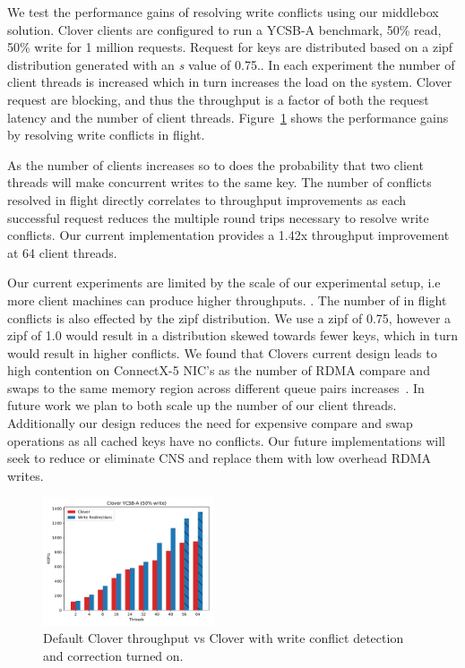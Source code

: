 We test the performance gains of resolving write conflicts using our
middlebox solution. Clover clients are configured to run a YCSB-A
benchmark, 50\% read, 50\% write for 1 million requests. Request for
keys are distributed based on a zipf distribution generated with an
\textit{s} value of 0.75.. In each
experiment the number of client threads is increased which in turn
increases the load on the system. Clover request are blocking, and
thus the throughput is a factor of both the request latency and the
number of client threads. Figure~\ref{fig:conflicts} shows the
performance gains by resolving write conflicts in flight.

As the number of clients increases so to does the probability that two
client threads will make concurrent writes to the same key. The number
of conflicts resolved in flight directly correlates to throughput
improvements as each successful request reduces the multiple round
trips necessary to resolve write conflicts. Our current implementation
provides a 1.42x throughput improvement at 64 client threads.

Our current experiments are limited by the scale of our experimental
setup, i.e more client machines can produce higher throughputs.
. 
The number of in flight conflicts is also effected by the zipf
distribution. We use a zipf of 0.75, however a zipf of 1.0 would
result in a distribution skewed towards fewer keys, which in turn
would result in higher conflicts. We found that Clovers current design
leads to high contention on ConnectX-5 NIC's as the number of RDMA
compare and swaps to the same memory region across different queue
pairs increases~\cite{design-guidelines}. In future work we plan to
both scale up the number of our client threads. Additionally our
design reduces the need for expensive compare and swap operations as
all cached keys have no conflicts. Our future implementations will
seek to reduce or eliminate CNS and replace them with low overhead
RDMA writes.

\begin{figure}
    \includegraphics[width=0.45\textwidth]{fig/throughput.pdf}
    \caption{Default Clover throughput vs Clover with write conflict
    detection and correction turned on.}
    \label{fig:conflicts}
\end{figure}

